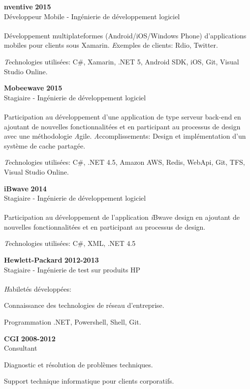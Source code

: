 \documentclass[margin,line]{res}
\begin{document}
\begin{resume}
{\bf nventive} \hfill {\bf 2015}\\
Développeur Mobile - Ingénierie de développement logiciel\\\\
Développement multiplateformes (Android/iOS/Windows Phone) d'applications mobiles pour clients sous Xamarin.
{\emph Exemples de clients:} Rdio, Twitter.

{\emph Technologies utilisées:} C\#, Xamarin, .NET 5, Android SDK, iOS, Git, Visual Studio Online.

{\bf Mobeewave} \hfill {\bf 2015}\\
Stagiaire - Ingénierie de développement logiciel\\\\
Participation au développement d'une application de type serveur back-end en ajoutant de nouvelles fonctionnalitées et en participant au processus de design avec une méthodologie {\emph Agile}.
{\emph Accomplissements:} Design et implémentation d'un système de cache partagée. 

{\emph Technologies utilisées:} C\#, .NET 4.5, Amazon AWS, Redis, WebApi, Git, TFS, Visual Studio Online.

{\bf iBwave} \hfill {\bf 2014}\\
Stagiaire - Ingénierie de développement logiciel\\\\
Participation au développement de l'application {\emph iBwave design} en ajoutant de nouvelles fonctionnalitées et en participant au processus de design.

{\emph Technologies utilisées:} C\#, XML, .NET 4.5

{\bf Hewlett-Packard} \hfill {\bf 2012-2013}\\
Stagiaire - Ingénierie de test sur produits HP \\
\\
{\emph Habiletés développées: }
\begin{compactitem}
\item Connaissance des technologies de réseau d'entreprise.
\item Programmation .NET, Powershell, Shell, Git.
\end{compactitem}

{\bf CGI} \hfill {\bf 2008-2012}\\
Consultant
\begin{compactitem}
\item Diagnostic et résolution de problèmes techniques.
\item Support technique informatique pour clients corporatifs.
\end{compactitem}


\end{resume}
\end{document}

